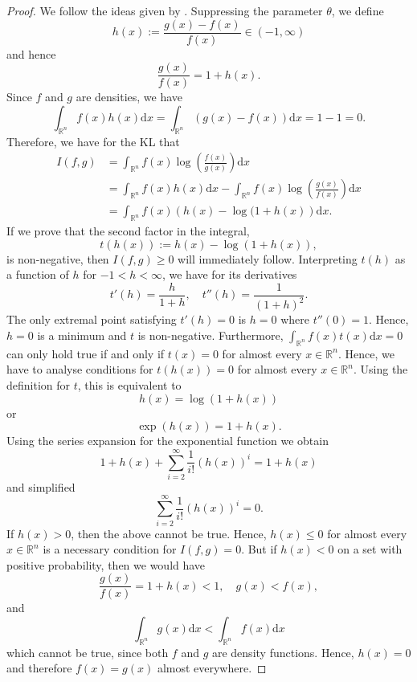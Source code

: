 \documentclass[a4paper, 12pt]{scrreprt}
\newcommand{\RR}{\mathbb{R}}
\begin{document}
\begin{proof} We follow the ideas given by
\textcite[chapter 7.8]{burnham2003model}. Suppressing the parameter $\theta$, we define
\[ 
h(x) := \frac{g(x) - f(x)}{f(x)} \in (-1,\infty)
\]
and hence
\[ 
\frac{g(x)}{f(x)} = 1 + h(x).
\]
Since $f$ and $g$ are densities, we have 
\[
\int_{\RR^n} f(x)h(x) \mathrm{d}x  = \int_{\RR^n} (g(x) - f(x)) \mathrm{d}x = 1 - 1 = 0.
\]
Therefore, we have for the KL that
\begin{align*}
I(f,g) &= \int_{\RR^n} f(x) \log \left( \frac{f(x)}{g(x)}  \right) \mathrm{d}x \\
&= \int_{\RR^n} f(x)h(x) \mathrm{d}x - \int_{\RR^n} f(x) \log \left( \frac{g(x)}{f(x)} \right) \mathrm{d}x \\
&= \int_{\RR^n} f(x) \left( h(x) - \log ( 1+h(x) \right) \mathrm{d}x.
\end{align*}
If we prove that the second factor in the integral, 
\[ 
t(h(x)) := h(x) - \log(1+h(x)), 
\]
is non-negative, then $I(f,g) \geq 0$ will immediately follow.
Interpreting $t(h)$ as a function of $h$ for $-1<h<\infty$, we have for its derivatives
\[
t'(h) = \frac{h}{1+h}, \quad t''(h) = \frac{1}{(1+h)^2}.
\]
The only extremal point satisfying $t'(h)=0$ is $h=0$ where $t''(0)=1$. 
Hence, $h=0$ is a minimum and $t$ is non-negative.
Furthermore, $\int_{\RR^n} f(x) t(x) \mathrm{d}x = 0$ can only hold true if and only if $t(x) = 0$ for almost every $x\in\RR^n$. Hence, we have to analyse conditions for 
$t(h(x)) = 0$ for almost every $x\in\RR^n$.
Using the definition for $t$, this is equivalent to
\[
h(x) = \log(1+h(x))
\]
or
\[
\exp(h(x)) = 1+h(x).
\]
Using the series expansion for the exponential function we obtain
\[
1+h(x) + \sum_{i=2}^\infty \frac{1}{i!}(h(x))^i = 1+h(x)
\]
and simplified
\[ 
\sum_{i=2}^\infty \frac{1}{i!}(h(x))^i = 0.
\]
If $h(x) > 0$, then the above cannot be true. Hence, $h(x) \leq 0$ for almost every $x\in\RR^n$ is a necessary condition for $I(f,g) = 0$.
But if $h(x) < 0$ on a set with positive probability, then we would have
\[
\frac{g(x)}{f(x)} = 1+ h(x) < 1, \quad  g(x) < f(x),
\]
and 
\[
\int_{\RR^n} g(x) \mathrm{d}x < \int_{\RR^n} f(x) \mathrm{d}x
\]
which cannot be true, since both $f$ and $g$ are density functions.
Hence, $h(x)=0$ and therefore $f(x) = g(x)$ almost everywhere.
\end{proof}
\end{document}
